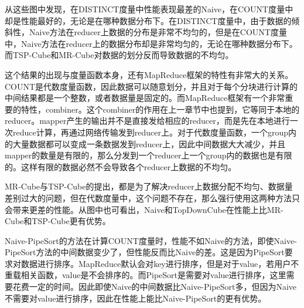 从这些图中发现，在DISTINCT度量中性能表现最差的Naive，在COUNT度量中却是性能最好的，无论是在哪种数据分布下。在DISTINCT度量中，由于数据的倾斜性，Naive方法在reducer上数据的分布是非常不均匀的，但是在COUNT度量中，Naive方法在reducer上的数据分布却是非常均匀的，无论在哪种数据分布下。而TSP-Cube和MR-Cube对数据的划分反而导致数据的不均匀。

这个结果的出现与度量函数本身，还有MapReduce框架的特性有非常大的关系。COUNT是代数度量函数，因此数据可以随意划分，并且对于每个分块进行计算的中间结果都是一个整数，或者数据量是固定的。而MapReduce框架有一个非常重要的特性，combiner。这个combiner的作用在上一章节中也提到，它等同于本地的reducer。mapper产生的输出并不是直接发给相应的reducer，而是先在本地进行一次reduce计算，再通过网络传输发到reducer上。对于代数度量函数，一个group内的大量数据都可以变成一条数据发到reducer上，因此中间数据大大减少，并且mapper的数量是有限的，那么分发到一个reducer上一个group内的数据也是有限的。这样有限的数据必然不会导致各个reducer上数据的不均匀。

MR-Cube与TSP-Cube的提出，都是为了解决reducer上数据分配不均匀、数据量差别过大的问题，但在代数度量中，这个问题不存在，那么强行使用这两种方法只会带来更差的性能。从图中也可看出，Naive和TopDownCube在性能上比MR-Cube和TSP-Cube更有优势。

Naive-PipeSort的方法在计算COUNT度量时，性能不如Naive的方法，即使Naive-PipeSort方法的中间数据变少了，但性能反而比Naive的差。这是因为PipeSort要求对数据进行排序。MapReduce默认会对key进行排序，但是对于value，若用户不重载相关函数，value是不会排序的。而PipeSort是需要对value进行排序，这里需要花费一定的时间。因此即使Naive的中间数据比Naive-PipeSort多，但因为Naive不需要对value进行排序，因此在性能上能比Naive-PipeSort的更有优势。

